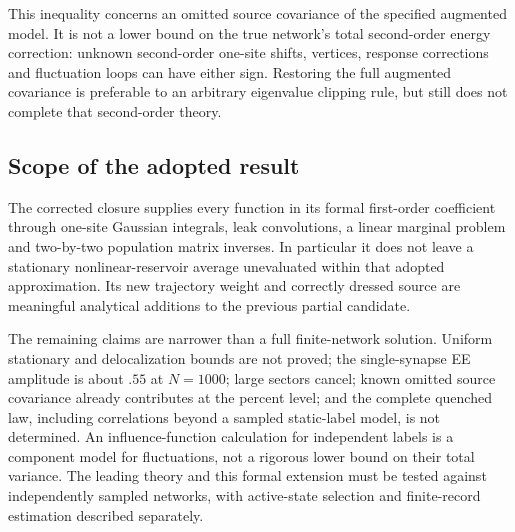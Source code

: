 This inequality concerns an omitted source covariance of the specified
augmented model. It is not a lower bound on the true network's total
second-order energy correction: unknown second-order one-site shifts,
vertices, response corrections and fluctuation loops can have either sign.
Restoring the full augmented covariance is preferable to an arbitrary
eigenvalue clipping rule, but still does not complete that second-order theory.

\subsection{Scope of the adopted result}
The corrected closure supplies every function in its formal first-order
coefficient through one-site Gaussian integrals, leak convolutions, a linear
marginal problem and two-by-two population matrix inverses. In particular it
does not leave a stationary nonlinear-reservoir average unevaluated within
that adopted approximation. Its new trajectory weight and correctly dressed
source are meaningful analytical additions to the previous partial candidate.

The remaining claims are narrower than a full finite-network solution.
Uniform stationary and delocalization bounds are not proved; the single-synapse
EE amplitude is about $.55$ at $N=1000$; large sectors cancel; known omitted
source covariance already contributes at the percent level; and the complete
quenched law, including correlations beyond a sampled static-label model,
is not determined. An influence-function calculation for independent labels
is a component model for fluctuations, not a rigorous lower bound on their
total variance. The leading theory and this formal extension must be tested
against independently sampled networks, with active-state selection and
finite-record estimation described separately.
